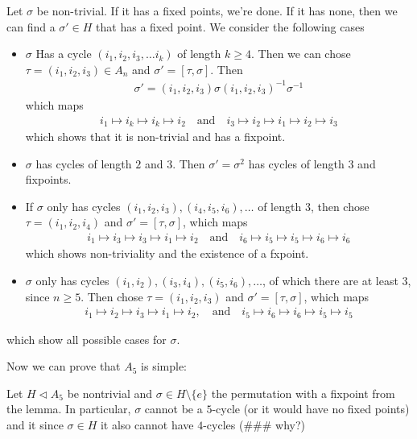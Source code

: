 Let $\sigma$ be non-trivial. If it has a fixed points, we're done. If it has none, then we can find a $\sigma' \in H$ that has a fixed point.
We consider the following cases
\begin{itemize}
	\item $\sigma$ Has a cycle $(i_1,i_2,i_3, \ldots i_k)$ of length $k \geq 4$. Then we can chose $\tau = (i_1,i_2,i_3) \in A_{n}$ and $\sigma' = [\tau,\sigma]$. Then
		\begin{align*}
			\sigma' = (i_1,i_2,i_3)\sigma(i_1,i_2,i_3)^{-1}\sigma^{-1}
		\end{align*}
		which maps
		\begin{align*}
			i_1 \mapsto i_k \mapsto i_k \mapsto i_2 \quad \text{and} \quad i_3 \mapsto i_2 \mapsto i_1 \mapsto i_2 \mapsto i_3
		\end{align*}
		which shows that it is non-trivial and has a fixpoint.
		
	\item $\sigma$ has cycles of length $2$ and $3$. Then $\sigma' = \sigma^{2}$ has cycles of length $3$ and fixpoints.
	\item If $\sigma$ only has cycles $(i_1,i_2,i_3),(i_4,i_5,i_6), \ldots$ of length $3$, then chose $\tau = (i_1,i_2,i_4)$ and $\sigma' = [\tau,\sigma]$, which maps
		\begin{align*}
			i_1 \mapsto i_3 \mapsto i_3 \mapsto i_1 \mapsto i_2 \quad \text{and} \quad i_6 \mapsto i_5 \mapsto i_5 \mapsto i_6 \mapsto i_6
		\end{align*}
		which shows non-triviality and the existence of a fxpoint.

	\item $\sigma$ only has cycles $(i_1,i_2),(i_3,i_4),(i_5,i_6), \ldots$, of which there are at least $3$, since $n \geq 5$. Then chose $\tau = (i_1,i_2,i_3)$ and $\sigma' = [\tau,\sigma]$, which maps
		\begin{align*}
			i_1 \mapsto i_2 \mapsto i_3 \mapsto i_1 \mapsto i_2, \quad \text{and} \quad i_5 \mapsto i_6 \mapsto i_6 \mapsto i_5 \mapsto i_5
		\end{align*}
\end{itemize}
which show all possible cases for $\sigma$.


Now we can prove that $A_5$ is simple:

Let $H \lhd A_5$ be nontrivial and $\sigma \in H \setminus \{e\}$ the permutation with a fixpoint from the lemma. In particular, $\sigma$ cannot be a $5$-cycle (or it would have no fixed points) and it since $\sigma \in H$ it also cannot have $4$-cycles (\#\#\# why?)

